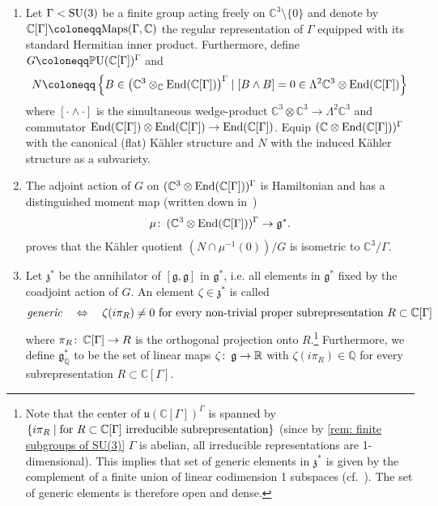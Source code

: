 \documentclass[11pt,a4paper]{scrartcl}
\newcommand{\col}{\colon \thinspace}
\newcommand{\End}{\textup{End}}
\newcommand{\SU}{\textup{SU}}
\newcommand{\U}{\textup{U}}
\numberwithin{equation}{section}
\theoremstyle{plain}
\theoremstyle{definition}
\theoremstyle{remark}
\begin{document}
\begin{enumerate}
\item Let $\Gamma<\SU(3)$ be a finite group acting freely on $\mathbb{C}^3\setminus \{0\}$ and denote by $\mathbb{C}[\Gamma]\coloneqq \textup{Maps}(\Gamma,\mathbb{C})$ the regular representation of $\Gamma$ equipped with its standard Hermitian inner product. Furthermore, define $G \coloneqq \mathbb{P}\U(\mathbb{C}[\Gamma])^\Gamma$ and \[ N \coloneqq \left\{ B \in \big( \mathbb{C}^3 \otimes_\mathbb{C} \End(\mathbb{C}[\Gamma]) \big)^\Gamma \mid [B \wedge B]=0 \in \Lambda^2\mathbb{C}^3 \otimes \End(\mathbb{C}[\Gamma]) \right\} \] where $[ \cdot \wedge \cdot]$ is the simultaneous wedge-product $\mathbb{C}^3 \otimes \mathbb{C}^3 \to \Lambda^2 \mathbb{C}^3$ and commutator $\End(\mathbb{C}[\Gamma])\otimes \End(\mathbb{C}[\Gamma])\to \End(\mathbb{C}[\Gamma])$. Equip $(\mathbb{C} \otimes \End(\mathbb{C}[\Gamma]))^\Gamma$ with the canonical (flat) Kähler structure and $N$ with the induced Kähler structure as a subvariety. 

\item The adjoint action of $G$ on $(\mathbb{C}^3 \otimes \End(\mathbb{C}[\Gamma]))^\Gamma$ is Hamiltonian and has a distinguished moment map (written down in~\cite[Proposition~3.1]{WalpuskiDegeratu-HYM_on_crepant_resolutions}) \[\mu \col (\mathbb{C}^3 \otimes \End(\mathbb{C}[\Gamma]))^\Gamma \to \mathfrak{g}^*.\] \cite[Section~4.2]{Sardo-Infirri-ParitalResolutions} proves that the Kähler quotient $(N \cap \mu^{-1}(0))/G$ is isometric to $\mathbb{C}^3/\Gamma$.

\item Let $\mathfrak{z}^*$ be the annihilator of $[\mathfrak{g},\mathfrak{g}]$ in $\mathfrak{g}^*$, i.e. all elements in $\mathfrak{g}^*$ fixed by the coadjoint action of $G$. An element $\zeta \in \mathfrak{z}^*$ is called \[ \textit{generic} \quad \Leftrightarrow \quad \textup{$\zeta (i \pi_R) \neq 0$ for every non-trivial proper subrepresentation $R\subset \mathbb{C}[\Gamma]$} \] where $\pi_R \col \mathbb{C}[\Gamma] \to R$ is the orthogonal projection onto $R$.\footnote{Note that the center of $\mathfrak{u}(\mathbb{C}[\Gamma])^\Gamma$ is spanned by $\{ i\pi_R \mid \textup{for $R \subset \mathbb{C}[\Gamma]$ irreducible subrepresentation} \}$ (since by \autoref{rem: finite subgroups of SU(3)} $\Gamma$ is abelian, all irreducible representations are 1-dimensional). This implies that set of generic elements in $\mathfrak{z}^*$ is given by the complement of a finite union of linear codimension 1 subspaces (cf.~\cite[Section~2,3]{WalpuskiDegeratu-HYM_on_crepant_resolutions}). The set of generic elements is therefore open and dense.}  Furthermore, we define $\mathfrak{g}^*_\mathbb{Q}$ to be the set of linear maps $\zeta \col \mathfrak{g} \to \mathbb{R}$ with $\zeta(i\pi_R) \in \mathbb{Q}$ for every subrepresentation $R\subset \mathbb{C}[\Gamma]$.


\end{enumerate}
\end{document}
